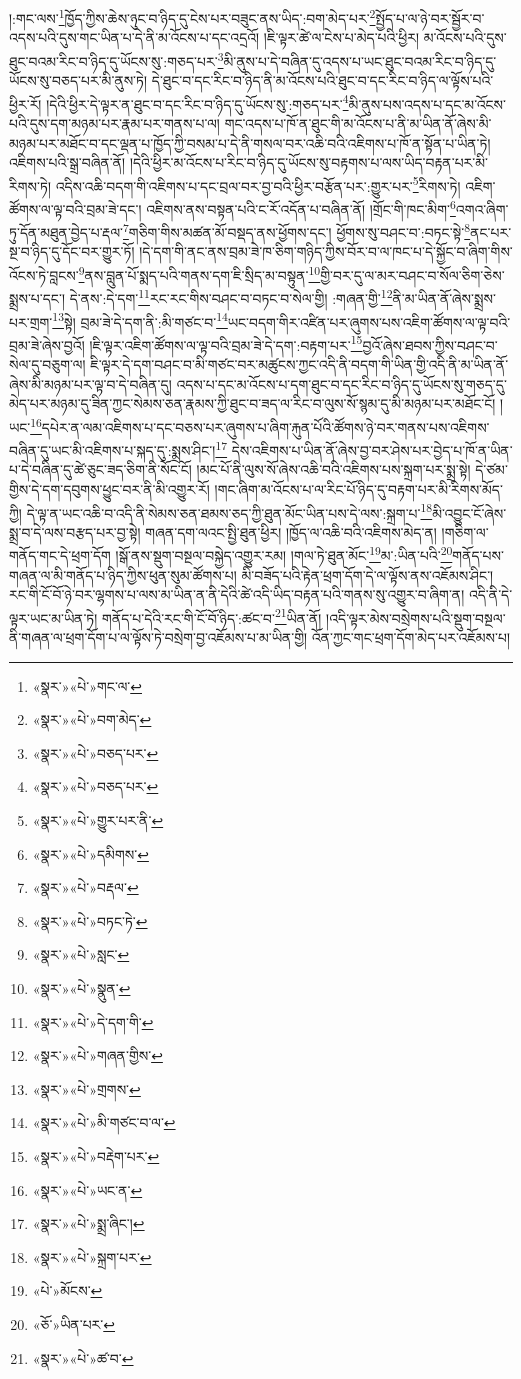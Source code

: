 །:གང་ལས་\footnote{«སྣར་»«པེ་»གང་ལ་}ཁྱོད་ཀྱིས་ཆེས་ཉུང་བ་ཉིད་དུ་ངེས་པར་བཟུང་ནས་ཡིད་:བག་མེད་པར་\footnote{«སྣར་»«པེ་»བག་མེད་}སྤྱོད་པ་ལ་ཉེ་བར་སྦྱོར་བ་འདས་པའི་དུས་གང་ཡིན་པ་དེ་ནི་མ་འོངས་པ་དང་འདྲའོ། །ཇི་ལྟར་ཚེ་ལ་ངེས་པ་མེད་པའི་ཕྱིར། མ་འོངས་པའི་དུས་ཐུང་བའམ་རིང་བ་ཉིད་དུ་ཡོངས་སུ་:གཅད་པར་\footnote{«སྣར་»«པེ་»བཅད་པར་}མི་ནུས་པ་དེ་བཞིན་དུ་འདས་པ་ཡང་ཐུང་བའམ་རིང་བ་ཉིད་དུ་ཡོངས་སུ་བཅད་པར་མི་ནུས་ཏེ། དེ་ཐུང་བ་དང་རིང་བ་ཉིད་ནི་མ་འོངས་པའི་ཐུང་བ་དང་རིང་བ་ཉིད་ལ་ལྟོས་པའི་ཕྱིར་རོ། །དེའི་ཕྱིར་དེ་ལྟར་ན་ཐུང་བ་དང་རིང་བ་ཉིད་དུ་ཡོངས་སུ་:གཅད་པར་\footnote{«སྣར་»«པེ་»བཅད་པར་}མི་ནུས་པས་འདས་པ་དང་མ་འོངས་པའི་དུས་དག་མཉམ་པར་རྣམ་པར་གནས་པ་ལ། གང་འདས་པ་ཁོ་ན་ཐུང་གི་མ་འོངས་པ་ནི་མ་ཡིན་ནོ་ཞེས་མི་མཉམ་པར་མཐོང་བ་དང་ལྡན་པ་ཁྱོད་ཀྱི་བསམ་པ་དེ་ནི་གསལ་བར་འཆི་བའི་འཇིགས་པ་ཁོ་ན་སྟོན་པ་ཡིན་ཏེ། འཇིགས་པའི་སྒྲ་བཞིན་ནོ། །དེའི་ཕྱིར་མ་འོངས་པ་རིང་བ་ཉིད་དུ་ཡོངས་སུ་བརྟགས་པ་ལས་ཡིད་བརྟན་པར་མི་རིགས་ཏེ། འདིས་འཆི་བདག་གི་འཇིགས་པ་དང་བྲལ་བར་བྱ་བའི་ཕྱིར་བརྩོན་པར་:གྱུར་པར་\footnote{«སྣར་»«པེ་»གྱུར་པར་ནི་}རིགས་ཏེ། འཇིག་ཚོགས་ལ་ལྟ་བའི་བྲམ་ཟེ་དང་། འཇིགས་ནས་བསྟན་པའི་ང་རོ་འདོན་པ་བཞིན་ནོ། །གྲོང་གི་ཁང་མིག་\footnote{«སྣར་»«པེ་»དམིགས་}འགའ་ཞིག་ཏུ་དོན་མཐུན་བྱེད་པ་རྡལ་\footnote{«སྣར་»«པེ་»བརྡལ་}གཅིག་གིས་མཚན་མོ་བསྡད་ནས་ཕྱོགས་དང་། ཕྱོགས་སུ་བཤང་བ་:བཏང་སྟེ་\footnote{«སྣར་»«པེ་»བཏང་ཏེ་}ནང་པར་སྔ་བ་ཉིད་དུ་དོང་བར་གྱུར་ཏོ། །དེ་དག་གི་ནང་ནས་བྲམ་ཟེ་ཁ་ཅིག་གཉིད་ཀྱིས་བོར་བ་ལ་ཁང་པ་དེ་སྐྱོང་བ་ཞིག་གིས་འོངས་ཏེ་བླངས་\footnote{«སྣར་»«པེ་»སླང་}ནས་བླུན་པོ་སྨད་པའི་གནས་དག་ཇི་སྲིད་མ་བསྟུན་\footnote{«སྣར་»«པེ་»སྣུན་}གྱི་བར་དུ་ལ་མར་བཤང་བ་སོལ་ཅིག་ཅེས་སྨྲས་པ་དང་། དེ་ནས་:དེ་དག་\footnote{«སྣར་»«པེ་»དེ་དག་གི་}རང་རང་གིས་བཤང་བ་བཏང་བ་སེལ་གྱི། :གཞན་གྱི་\footnote{«སྣར་»«པེ་»གཞན་གྱིས་}ནི་མ་ཡིན་ནོ་ཞེས་སྨྲས་པར་གྲག་\footnote{«སྣར་»«པེ་»གྲགས་}སྟེ། བྲམ་ཟེ་དེ་དག་ནི་:མི་གཙང་བ་\footnote{«སྣར་»«པེ་»མི་གཙང་བ་ལ་}ཡང་བདག་གིར་འཛིན་པར་ཞུགས་པས་འཇིག་ཚོགས་ལ་ལྟ་བའི་བྲམ་ཟེ་ཞེས་བྱའོ། །ཇི་ལྟར་འཇིག་ཚོགས་ལ་ལྟ་བའི་བྲམ་ཟེ་དེ་དག་:བརྟག་པར་\footnote{«སྣར་»«པེ་»བརྡེག་པར་}བྱའོ་ཞེས་ཐབས་ཀྱིས་བཤང་བ་སེལ་དུ་བཅུག་ལ། ཇི་ལྟར་དེ་དག་བཤང་བ་མི་གཙང་བར་མཚུངས་ཀྱང་འདི་ནི་བདག་གི་ཡིན་གྱི་འདི་ནི་མ་ཡིན་ནོ་ཞེས་མི་མཉམ་པར་ལྟ་བ་དེ་བཞིན་དུ། འདས་པ་དང་མ་འོངས་པ་དག་ཐུང་བ་དང་རིང་བ་ཉིད་དུ་ཡོངས་སུ་གཅད་དུ་མེད་པར་མཉམ་དུ་ཟིན་ཀྱང་སེམས་ཅན་རྣམས་ཀྱི་ཐུང་བ་ཟད་ལ་རིང་བ་ལུས་སོ་སྙམ་དུ་མི་མཉམ་པར་མཐོང་ངོ། །ཡང་\footnote{«སྣར་»«པེ་»ཡང་ན་}དཔེར་ན་ལམ་འཇིགས་པ་དང་བཅས་པར་ཞུགས་པ་ཞིག་རྐུན་པོའི་ཚོགས་ཉེ་བར་གནས་པས་འཇིགས་བཞིན་དུ་ཡང་མི་འཇིགས་པ་སྐད་དུ་:སྨྲས་ཤིང་།\footnote{«སྣར་»«པེ་»སྨྲ་ཞིང་།} དེས་འཇིགས་པ་ཡིན་ནོ་ཞེས་བྱ་བར་ཤེས་པར་བྱེད་པ་ཁོ་ན་ཡིན་པ་དེ་བཞིན་དུ་ཚེ་ཅུང་ཟད་ཅིག་ནི་སོང་ངོ། །མང་པོ་ནི་ལུས་སོ་ཞེས་འཆི་བའི་འཇིགས་པས་སྐྲག་པར་སྨྲ་སྟེ། དེ་ཙམ་གྱིས་དེ་དག་དབུགས་ཕྱུང་བར་ནི་མི་འགྱུར་རོ། །གང་ཞིག་མ་འོངས་པ་ལ་རིང་པོ་ཉིད་དུ་བརྟག་པར་མི་རིགས་མོད་ཀྱི། དེ་ལྟ་ན་ཡང་འཆི་བ་འདི་ནི་སེམས་ཅན་ཐམས་ཅད་ཀྱི་ཐུན་མོང་ཡིན་པས་དེ་ལས་:སྐྲག་པ་\footnote{«སྣར་»«པེ་»སྐྲག་པར་}མི་འབྱུང་ངོ་ཞེས་སྨྲ་བ་དེ་ལས་བརྩད་པར་བྱ་སྟེ། གཞན་དག་ལའང་སྤྱི་ཐུན་ཕྱིར། །ཁྱོད་ལ་འཆི་བའི་འཇིགས་མེད་ན། །གཅིག་ལ་གནོད་གང་དེ་ཕྲག་དོག །སྒོ་ནས་སྡུག་བསྔལ་བསྐྱེད་འགྱུར་རམ། །གལ་ཏེ་ཐུན་མོང་\footnote{«པེ་»མོངས་}མ་:ཡིན་པའི་\footnote{«ཅོ་»ཡིན་པར་}གནོད་པས་གཞན་ལ་མི་གནོད་པ་ཉིད་ཀྱིས་ཕུན་སུམ་ཚོགས་པ། མི་བཟོད་པའི་རྟེན་ཕྲག་དོག་དེ་ལ་ལྟོས་ནས་འཇོམས་ཤིང་། རང་གི་ངོ་བོ་ཉེ་བར་ལྷགས་པ་ལས་མ་ཡིན་ན་ནི་དེའི་ཚེ་འདི་ཡིད་བརྟན་པའི་གནས་སུ་འགྱུར་བ་ཞིག་ན། འདི་ནི་དེ་ལྟར་ཡང་མ་ཡིན་ཏེ། གནོད་པ་དེའི་རང་གི་ངོ་བོ་ཉིད་:ཚང་བ་\footnote{«སྣར་»«པེ་»ཚ་བ་}ཡིན་ནོ། །འདི་ལྟར་མེས་བསྲེགས་པའི་སྡུག་བསྔལ་ནི་གཞན་ལ་ཕྲག་དོག་པ་ལ་ལྟོས་ཏེ་བསྲེག་བྱ་འཇོམས་པ་མ་ཡིན་གྱི། འོན་ཀྱང་གང་ཕྲག་དོག་མེད་པར་འཇོམས་པ། 